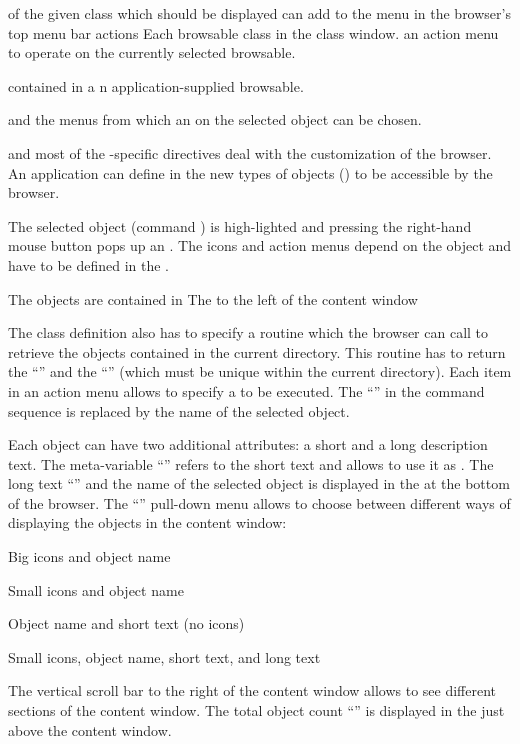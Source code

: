 
of the given class which
should be displayed 
can add to the  menu
in the browser's top menu bar actions
Each browsable class in the class window.
an action menu to operate
on the currently selected browsable.

contained in a
n application-supplied
browsable. 

 and the menus from which an  on the selected object
can be chosen. 

 and most of the \Motif{}-specific \CDF{} directives deal with the
customization of the browser.
An application can define in the \CDF{} new types of objects 
() to be accessible by the browser.

The selected object (command ) is high-lighted and pressing
the right-hand mouse button pops up an .
The icons and action menus depend on the object  and have
to be defined in the \CDF{}.

The objects are contained in 
The  to the left of the content window 

The class definition also has to specify a routine which the browser
can call to retrieve the objects contained in the current directory.
This routine has to return the  ``'' and
the  ``'' (which must be unique within the
current directory). 
Each item in an action menu allows to specify a 
to be executed.
The  ``\Lit{[this]}'' in the command sequence is
replaced by the name of the selected object.

Each object can have two additional attributes: a short and a long
description text.
The meta-variable ``\Lit{[that]}'' refers to the short text and allows
to use it as .
The long text ``'' and the name of the selected
object is displayed in the  at the bottom of
the browser. 
The ``'' pull-down menu allows to choose between different
ways of displaying the objects in the content window:
\begin{UL}
\item Big icons and object name
\item Small icons and object name
\item Object name and short text (no icons)
\item Small icons, object name, short text, and long text
\end{UL}
The vertical scroll bar to the right of the content window allows to
see different sections of the content window.
The total object count ``'' is displayed
in the  just above the content window.


